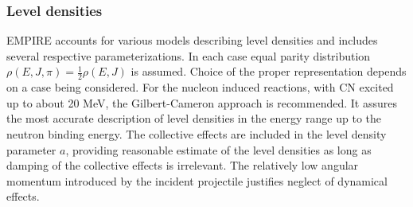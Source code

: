 \documentclass[twocolumn,amsmath,amssymb,10pt,groupedaddress,a4paper]{revtex4}
\begin{document}
\subsubsection{Level densities}
EMPIRE accounts for various models describing level densities
and includes several respective parameterizations. In each case equal
parity distribution $\rho(E,J,\pi)=\frac{1}{2}\rho(E,J)$ is assumed.
Choice of the proper representation depends on a case being considered.
For the nucleon induced reactions, with CN excited up to about 20
MeV, the Gilbert-Cameron approach is recommended. It assures the most
accurate description of level densities in the energy range up to
the neutron binding energy. The collective effects are included in
the level density parameter $a$, providing reasonable estimate of
the level densities as long as damping of the collective effects is
irrelevant. The relatively low angular momentum introduced by the
incident projectile justifies neglect of dynamical effects.
\end{document}
